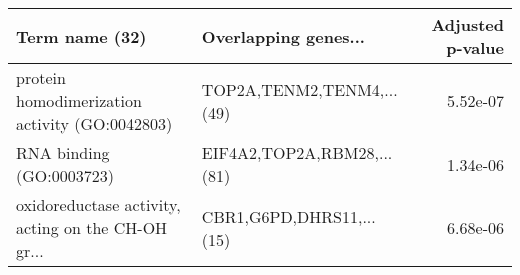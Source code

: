 \begin{tabular}{llr}
\toprule
                                    Term name (32) &       Overlapping genes... &  Adjusted p-value \\
\midrule
    protein homodimerization activity (GO:0042803) &  TOP2A,TENM2,TENM4,...(49) &          5.52e-07 \\
                          RNA binding (GO:0003723) & EIF4A2,TOP2A,RBM28,...(81) &          1.34e-06 \\
oxidoreductase activity, acting on the CH-OH gr... &   CBR1,G6PD,DHRS11,...(15) &          6.68e-06 \\
\bottomrule
\end{tabular}
